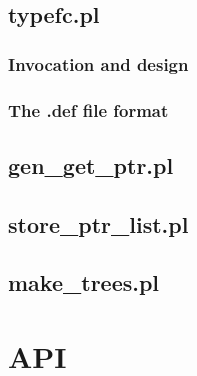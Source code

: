 \documentclass{article}
\begin{document}
\subsection{typefc.pl}
\label{sec.typefc}
\subsubsection{Invocation and design}
\subsubsection{The .def file format}
\subsection{gen\_get\_ptr.pl}
\subsection{store\_ptr\_list.pl}
\subsection{make\_trees.pl}
\section{API}
\end{document}
